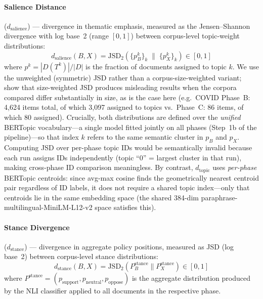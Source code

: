 \documentclass[sigconf,natbib]{acmart}
\begin{document}
\paragraph{Salience Distance} ($d_{\text{salience}}$) — divergence in thematic emphasis,
measured as the Jensen--Shannon divergence \citep{Lin1991} with log base~2 (range $[0,1]$)
between corpus-level topic-weight distributions:
\begin{equation}
d_{\text{salience}}(B, X) = \mathrm{JSD}_2\!\left(\{p_B^k\}_k \;\|\; \{p_X^k\}_k\right) \in [0,1]
\end{equation}
where $p^k = |D(T^k)| / |D|$ is the fraction of documents assigned to topic $k$.
We use the unweighted (symmetric) JSD rather than a corpus-size-weighted variant;
\citet{Lu2020} show that size-weighted JSD produces misleading results when the corpora
compared differ substantially in size, as is the case here (e.g.\ COVID Phase~B: 4,624 items total,
of which 3,097 assigned to topics vs.\ Phase~C: 86 items, of which 80 assigned).
Crucially, both distributions are defined over the \emph{unified} BERTopic vocabulary---a
single model fitted jointly on all phases (Step~1b of the pipeline)---so that index $k$
refers to the same semantic cluster in $p_B$ and $p_X$.
Computing JSD over per-phase topic IDs would be semantically invalid because each run
assigns IDs independently (topic ``0'' = largest cluster in that run), making cross-phase
ID comparison meaningless.
By contrast, $d_{\text{topic}}$ uses \emph{per-phase} BERTopic centroids: since avg-max cosine
finds the geometrically nearest centroid pair regardless of ID labels, it does not require
a shared topic index---only that centroids lie in the same embedding space (the shared
384-dim paraphrase-multilingual-MiniLM-L12-v2 space satisfies this).

\paragraph{Stance Divergence} ($d_{\text{stance}}$) — divergence in aggregate policy
positions, measured as JSD (log base~2) between corpus-level stance distributions:
\begin{equation}
d_{\text{stance}}(B, X) = \mathrm{JSD}_2(P_B^{\text{stance}} \| P_X^{\text{stance}}) \in [0, 1]
\end{equation}
where $P^{\text{stance}} = (p_{\text{support}}, p_{\text{neutral}}, p_{\text{oppose}})$
is the aggregate distribution produced by the NLI classifier applied to all documents
in the respective phase.
\end{document}
